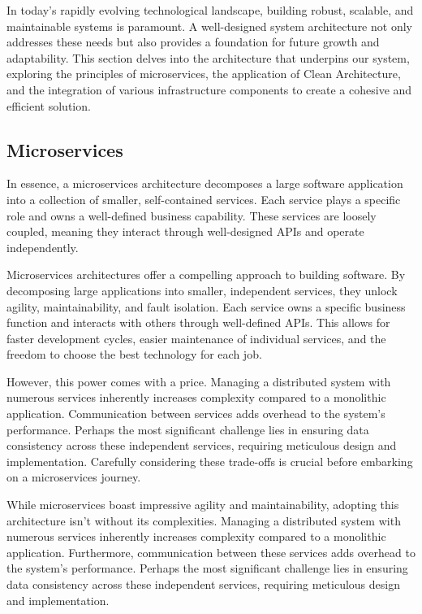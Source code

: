 In today's rapidly evolving technological landscape, building robust, scalable,
and maintainable systems is paramount. A well-designed system architecture not
only addresses these needs but also provides a foundation for future growth and
adaptability. This section delves into the architecture that underpins our
system, exploring the principles of microservices, the application of Clean
Architecture, and the integration of various infrastructure components to create
a cohesive and efficient solution.

\subsection{Microservices}

In essence, a microservices architecture decomposes a large software application
into a collection of smaller, self-contained services. Each service plays a
specific role and owns a well-defined business capability. These services are
loosely coupled, meaning they interact through well-designed APIs and operate
independently.

Microservices architectures offer a compelling approach to building software. By
decomposing large applications into smaller, independent services, they unlock
agility, maintainability, and fault isolation.  Each service owns a specific
business function and interacts with others through well-defined APIs. This
allows for faster development cycles, easier maintenance of individual services,
and the freedom to choose the best technology for each job.

However, this power comes with a price. Managing a distributed system with
numerous services inherently increases complexity compared to a monolithic
application. Communication between services adds overhead to the system's
performance. Perhaps the most significant challenge lies in ensuring data
consistency across these independent services, requiring meticulous design and
implementation.  Carefully considering these trade-offs is crucial before
embarking on a microservices journey.

While microservices boast impressive agility and maintainability, adopting this
architecture isn't without its complexities.  Managing a distributed system with
numerous services inherently increases complexity compared to a monolithic
application.  Furthermore, communication between these services adds overhead to
the system's performance.  Perhaps the most significant challenge lies in
ensuring data consistency across these independent services, requiring
meticulous design and implementation.

